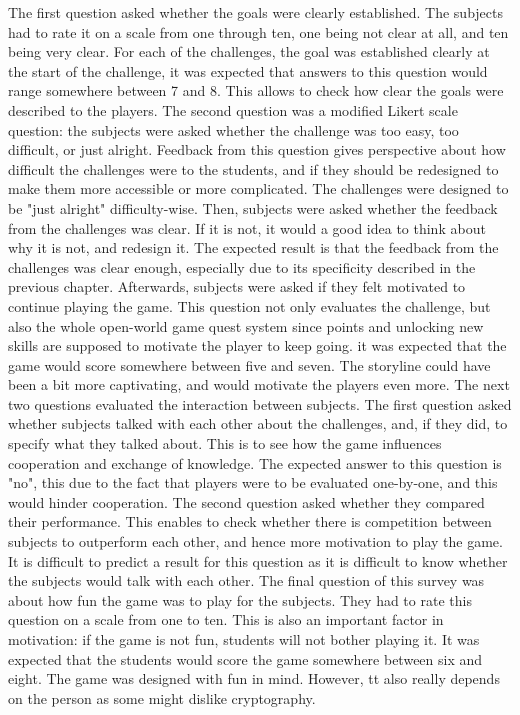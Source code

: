 \documentclass{l4proj}
\begin{document}
The first question asked whether the goals were clearly established. 
The subjects had to rate it on a scale from one through ten, one being not clear at all, and ten being very clear.
For each of the challenges, the goal was established clearly at the start of the challenge, 
it was expected that answers to this question would range somewhere between 7 and 8.
This allows to check how clear the goals were described to the players.
The second question was a modified Likert scale question: 
the subjects were asked whether the challenge was too easy, too difficult, or just alright.
Feedback from this question gives perspective about how difficult the challenges were to the students,
and if they should be redesigned to make them more accessible or more complicated.
The challenges were designed to be "just alright" difficulty-wise.
Then, subjects were asked whether the feedback from the challenges was clear. 
If it is not, it would a good idea to think about why it is not, and redesign it.
The expected result is that the feedback from the challenges was clear enough, 
especially due to its specificity described in the previous chapter.
Afterwards, subjects were asked if they felt motivated to continue playing the game.
This question not only evaluates the challenge, but also the whole open-world game quest system since 
points and unlocking new skills are supposed to motivate the player to keep going.
it was expected that the game would score somewhere between five and seven.
The storyline could have been a bit more captivating, and would motivate the players even more.
The next two questions evaluated the interaction between subjects.
The first question asked whether subjects talked with each other about the challenges, and, if they did, 
to specify what they talked about. This is to see how the game influences cooperation and exchange of knowledge.
The expected answer to this question is "no", this due to the fact that players were to be evaluated one-by-one,
and this would hinder cooperation.
The second question asked whether they compared their performance. 
This enables to check whether there is competition between subjects to outperform each other, 
and hence more motivation to play the game.
It is difficult to predict a result for this question as it is difficult to know whether the subjects would talk with each other.
The final question of this survey was about how fun the game was to play for the subjects.
They had to rate this question on a scale from one to ten.
This is also an important factor in motivation: if the game is not fun, students will not bother playing it.
It was expected that the students would score the game somewhere between six and eight.
The game was designed with fun in mind. However,
tt also really depends on the person as some might dislike cryptography.
\end{document}
